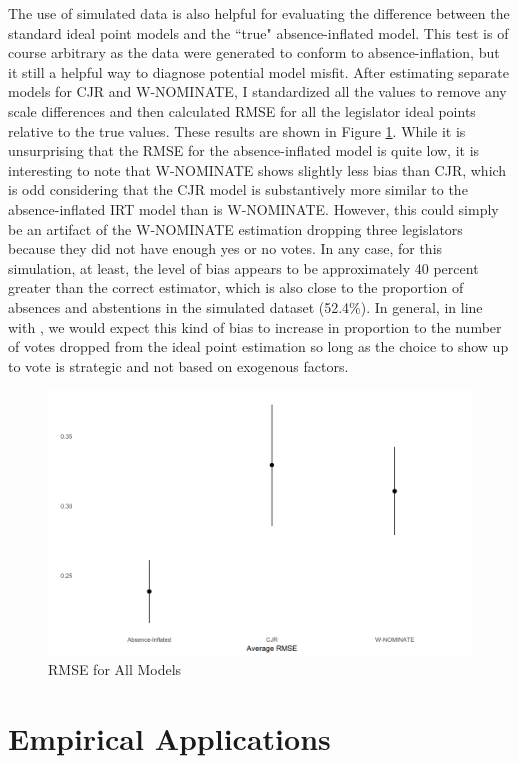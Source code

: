 	The use of simulated data is also helpful for evaluating the difference between the standard ideal point models and the ``true" absence-inflated model. This test is of course arbitrary as the data were generated to conform to absence-inflation, but it still a helpful way to diagnose potential model misfit. After estimating separate models for CJR and W-NOMINATE, I standardized all the values to remove any scale differences and then calculated RMSE for all the legislator ideal points relative to the true values. These results are shown in Figure \ref{sim_rmse}. While it is unsurprising that the RMSE for the absence-inflated model is quite low, it is interesting to note that W-NOMINATE shows slightly less bias than CJR, which is odd considering that the CJR model is substantively more similar to the absence-inflated IRT model than is W-NOMINATE. However, this could simply be an artifact of the W-NOMINATE estimation dropping three legislators because they did not have enough yes or no votes. In any case, for this simulation, at least, the level of bias appears to be approximately 40 percent greater than the correct estimator, which is also close to the proportion of absences and abstentions in the simulated dataset (52.4\%). In general, in line with \textcite{rosas2015}, we would expect this kind of bias to increase in proportion to the number of votes dropped from the ideal point estimation so long as the choice to show up to vote is strategic and not based on exogenous factors.
	
	\begin{figure}
		\caption{RMSE for All Models}\label{sim_rmse}
		\includegraphics[width=\linewidth]{sim_rmse_allmods}
	\end{figure} 
	
	
	\section*{Empirical Applications}
	
